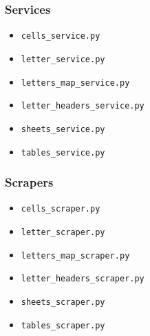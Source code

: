 	\subsubsection{Services}

	\begin{itemize}
	\item \texttt{cells\_service.py}


	\item \texttt{letter\_service.py}


	\item \texttt{letters\_map\_service.py}


	\item \texttt{letter\_headers\_service.py}


	\item \texttt{sheets\_service.py}


	\item \texttt{tables\_service.py}

	\end{itemize}

	\subsubsection{Scrapers}

	\begin{itemize}
		\item \texttt{cells\_scraper.py}


		\item \texttt{letter\_scraper.py}


		\item \texttt{letters\_map\_scraper.py}


		\item \texttt{letter\_headers\_scraper.py}


		\item \texttt{sheets\_scraper.py}


		\item \texttt{tables\_scraper.py}

	\end{itemize}

	\newpage
